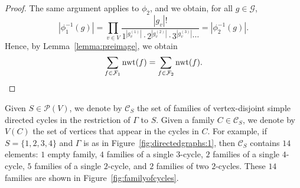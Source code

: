 \documentclass[11pt]{article}
\theoremstyle{definition}
\numberwithin{equation}{section}
\newcommand{\mtp}[1]{^{(#1)}} \newcommand{\graph}{\varGamma}
\newcommand{\vertices}{V}
\DeclareMathOperator{\normalizedweight}{nwt}
\begin{document}
\begin{proof}
    The same argument applies to \(\phi_2\),
    and we obtain, for all \(g \in \mathcal{G}\),
    \begin{equation*}
        \left| \phi_1^{-1}(g) \right| =
        \prod_{v \in \vertices} \frac{\left| g_v \right|!}{1^{\left| g_v\mtp{1} \right|} \cdot 2^{\left| g_v\mtp{2} \right|} \cdot 3^{\left| g_v\mtp{3} \right|} \cdots} =
        \left| \phi_2^{-1}(g) \right|.
    \end{equation*}
    Hence, by Lemma~\ref{lemma:preimage}, we obtain 
    \begin{equation*}
        \sum_{f \in \mathcal{F}_1} \normalizedweight(f)
        = \sum_{f \in \mathcal{F}_2} \normalizedweight(f). \qedhere
    \end{equation*}
\end{proof}

Given \(S \in \mathcal{P}(V)\),
we denote by \(\mathcal{C}_S\) the set of families of vertex-disjoint simple directed cycles in the restriction of \(\graph\) to \(S\).
Given a family \(C \in \mathcal{C}_S\),
we denote by \(V(C)\) the set of vertices that appear in the cycles in \(C\).
For example, if \(S = \{1, 2, 3, 4\}\) and \(\graph\) is as in Figure~\ref{fig:directedgraphs:1},
then \(\mathcal{C}_S\) contains \(14\) elements:
\(1\) empty family,
\(4\) families of a single \(3\)-cycle,
\(2\) families of a single \(4\)-cycle,
\(5\) families of a single \(2\)-cycle,
and \(2\) families of two \(2\)-cycles.
These \(14\) families are shown in Figure~\ref{fig:familyofcycles}.
\end{document}

